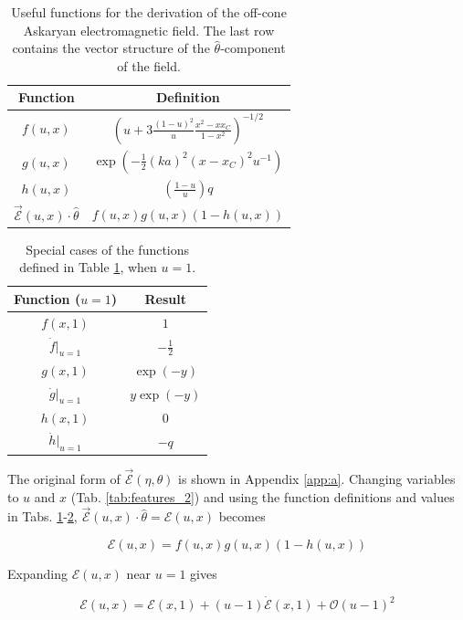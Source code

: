 \documentclass[amsmath,amssymb,aps,prd,10pt,twocolumn]{revtex4}
\begin{document}
\begin{table}
\renewcommand{\arraystretch}{2}
\begin{tabular}{| c | c |} \hline
Function & Definition \\ \hline
$f(u,x)$ & $\left( u + 3 \frac{(1-u)^2}{u} \frac{x^2 - x x_C}{1-x^2} \right)^{-1/2}$ \\
$g(u,x)$ & $\exp \left( -\frac{1}{2}(ka)^2 (x - x_C)^2 u^{-1} \right)$ \\
$h(u,x)$ & $\left( \frac{1-u}{u} \right) q$ \\
$\vec{\mathcal{E}}(u,x) \cdot \hat{\theta}$ & $f(u,x) g(u,x)(1 - h(u,x))$ \\ \hline
\end{tabular}
\caption{\label{tab:features_3} Useful functions for the derivation of the off-cone Askaryan electromagnetic field.  The last row contains the vector structure of the $\hat{\theta}$-component of the field.}
\end{table}

\begin{table}
\begin{tabular}{| c | c |} \hline
Function ($u = 1$) & Result \\ \hline
$f(x,1)$ & $1$ \\
$\dot{f}|_{u = 1}$ & $-\frac{1}{2}$ \\
$g(x,1)$ & $\exp(-y)$ \\
$\dot{g}|_{u = 1}$ & $y \exp(-y)$ \\
$h(x,1)$ & $0$ \\
$\dot{h}|_{u = 1}$ & $-q$ \\ \hline
\end{tabular}
\caption{\label{tab:features_4} Special cases of the functions defined in Table \ref{tab:features_3}, when $u = 1$.}
\end{table}

The original form of $\vec{\mathcal{E}}(\eta,\theta)$ is shown in Appendix \ref{app:a}.  Changing variables to $u$ and $x$ (Tab. \ref{tab:features_2}) and using the function definitions and values in Tabs. \ref{tab:features_3}-\ref{tab:features_4}, $\vec{\mathcal{E}}(u,x) \cdot \hat{\theta} = \mathcal{E}(u,x)$ becomes

\begin{equation}
\mathcal{E}(u,x) = f(u,x) g(u,x) (1 - h(u,x))
\end{equation}

Expanding $\mathcal{E}(u,x)$ near $u = 1$ gives

\begin{equation}
\mathcal{E}(u,x) = \mathcal{E}(x,1) + (u-1) \dot{\mathcal{E}}(x,1) + \mathcal{O}(u-1)^2 \label{eq:expand}
\end{equation}
\end{document}

